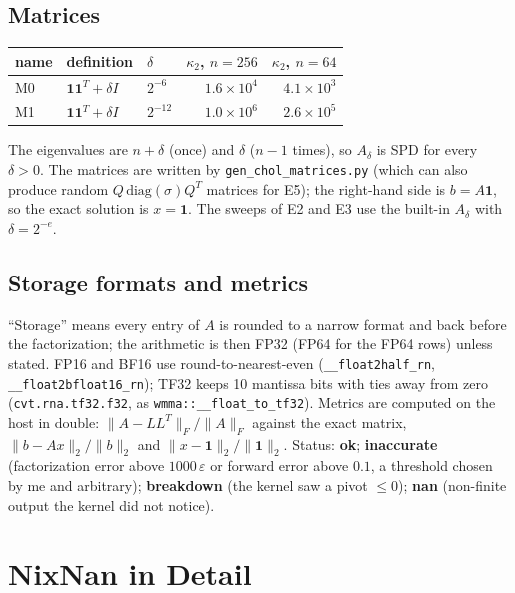 \documentclass[11pt,a4paper]{article}
\begin{document}
\subsection{Matrices}

\begin{center}\small
\begin{tabular}{lllrr}
\toprule
name & definition & $\delta$ & $\kappa_2$, $n=256$ & $\kappa_2$, $n=64$\\
\midrule
M0 & $\mathbf{1}\mathbf{1}^T+\delta I$ & $2^{-6}$ & $1.6\times10^{4}$ & $4.1\times10^{3}$\\
M1 & $\mathbf{1}\mathbf{1}^T+\delta I$ & $2^{-12}$ & $1.0\times10^{6}$ & $2.6\times10^{5}$\\
\bottomrule
\end{tabular}
\end{center}

The eigenvalues are $n+\delta$ (once) and $\delta$ ($n-1$ times), so $A_\delta$ is SPD for every $\delta>0$. The matrices are written by
\texttt{gen\_chol\_matrices.py} (which can also produce random $Q\,\mathrm{diag}(\sigma)Q^T$ matrices for E5); the right-hand side is $b=A\mathbf{1}$, so the exact solution is $x=\mathbf{1}$.
The sweeps of E2 and E3 use the built-in $A_\delta$ with $\delta=2^{-e}$.

\subsection{Storage formats and metrics}

``Storage'' means every entry of $A$ is rounded to a narrow format and back before the factorization; the arithmetic is then FP32 (FP64 for the FP64 rows) unless
stated. FP16 and BF16 use round-to-nearest-even (\texttt{\_\_float2half\_rn}, \texttt{\_\_float2bfloat16\_rn}); TF32 keeps 10 mantissa bits with ties away from zero
(\texttt{cvt.rna.tf32.f32}, as \texttt{wmma::\_\_float\_to\_tf32}). Metrics are computed on the host in double:
$\|A-LL^T\|_F/\|A\|_F$ against the exact matrix, $\|b-Ax\|_2/\|b\|_2$ and $\|x-\mathbf{1}\|_2/\|\mathbf{1}\|_2$.
Status: \textbf{ok}; \textbf{inaccurate} (factorization error above $1000\,\varepsilon$ or forward error above $0.1$, a threshold chosen by me and arbitrary);
\textbf{breakdown} (the kernel saw a pivot $\le0$); \textbf{nan} (non-finite output the kernel did not notice).

\section{NixNan in Detail}\label{sec:nixnan}
\end{document}
